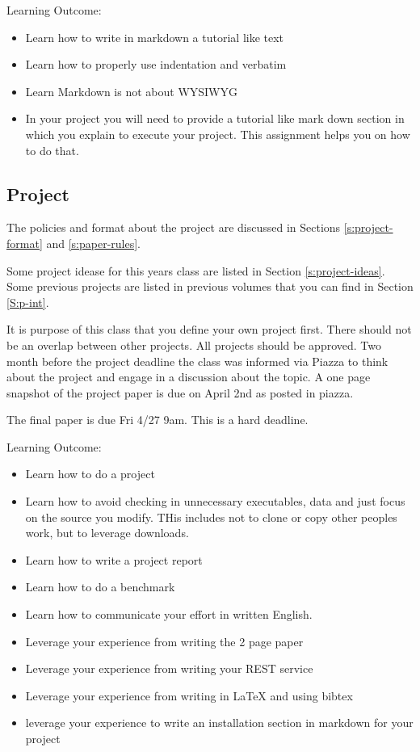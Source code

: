 Learning Outcome:
\begin{itemize}
\item Learn how to write in markdown a tutorial like text
\item Learn how to properly use indentation and verbatim 
\item Learn Markdown is not about WYSIWYG
\item In your project you will need to provide a tutorial like mark
  down section in which you explain to execute your project. This
  assignment helps you on how to do that.
\end{itemize}

\subsection{Project}
\label{E:project}

\begin{exercise} 

The policies and format about the project are discussed in Sections
\ref{s:project-format} and
\ref{s:paper-rules}.

Some project idease for this years class are listed in Section
\ref{s:project-ideas}. Some previous projects are listed in previous
volumes that you can find in Section \ref{S:p-int}.

It is purpose of this class that you define your own project
first. There should not be an overlap between other projects. All
projects should be approved.  Two month before the project deadline
the class was informed via Piazza to think about the project and
engage in a discussion about the topic. A one page snapshot of the
project paper is due on April 2nd as posted in piazza.

The final paper is due Fri 4/27 9am. This is a hard deadline.

\end{exercise} 


Learning Outcome:
\begin{itemize}
\item Learn how to do a project
\item Learn how to avoid checking in unnecessary executables, data and
  just focus on the source you modify. THis includes not to clone or
  copy other peoples work, but to leverage downloads.
\item Learn how to write a project report
\item Learn how to do a benchmark
\item Learn how to communicate your effort in written English.
\item Leverage your experience from writing the 2 page paper
\item Leverage your experience from writing your REST service
\item Leverage your experience from writing in LaTeX and using bibtex
\item leverage your experience to write an installation section in
  markdown for your project
\end{itemize}

